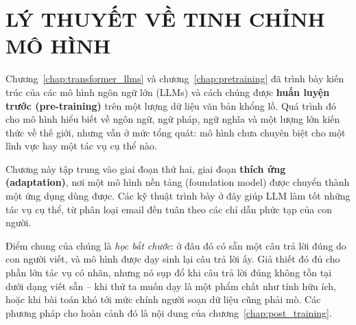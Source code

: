 \chapter{LÝ THUYẾT VỀ TINH CHỈNH MÔ HÌNH}
\label{chap:finetuning_alignment}

Chương~\ref{chap:transformer_llms} và chương~\ref{chap:pretraining} đã trình bày kiến trúc của các mô hình ngôn ngữ lớn (LLMs) và cách chúng được \textbf{huấn luyện trước (pre-training)} trên một lượng dữ liệu văn bản khổng lồ. Quá trình đó cho mô hình hiểu biết về ngôn ngữ, ngữ pháp, ngữ nghĩa và một lượng lớn kiến thức về thế giới, nhưng vẫn ở mức tổng quát: mô hình chưa chuyên biệt cho một lĩnh vực hay một tác vụ cụ thể nào.

Chương này tập trung vào giai đoạn thứ hai, giai đoạn \textbf{thích ứng (adaptation)}, nơi một mô hình nền tảng (foundation model) được chuyển thành một ứng dụng dùng được. Các kỹ thuật trình bày ở đây giúp LLM làm tốt những tác vụ cụ thể, từ phân loại email đến tuân theo các chỉ dẫn phức tạp của con người.

Điểm chung của chúng là \emph{học bắt chước}: ở đâu đó có sẵn một câu trả lời đúng do con người viết, và mô hình được dạy sinh lại câu trả lời ấy. Giả thiết đó đủ cho phần lớn tác vụ có nhãn, nhưng nó sụp đổ khi câu trả lời đúng không tồn tại dưới dạng viết sẵn -- khi thứ ta muốn dạy là một phẩm chất như tính hữu ích, hoặc khi bài toán khó tới mức chính người soạn dữ liệu cũng phải mò. Các phương pháp cho hoàn cảnh đó là nội dung của chương~\ref{chap:post_training}.